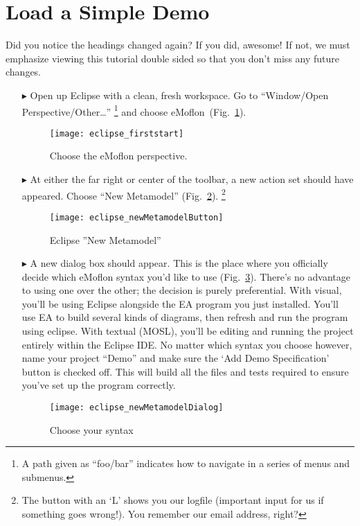 \newpage
\genHeader

\section{Load a Simple Demo}

Did you notice the headings changed again? If you did, awesome! If not, we must emphasize viewing this tutorial double sided so that you don't miss any future changes.

\begin{itemize}
\item[$\blacktriangleright$] Open up Eclipse with a clean, fresh workspace. Go to ``Window/Open Perspective/Other\ldots'' \footnote{A path given as ``foo/bar'' indicates how to navigate in a series of menus and submenus.} and choose eMoflon~(Fig.~\ref{fig_eclipse}).

\begin{figure}[htbp]
	\centering
  \texttt{[image: eclipse\_firststart]}
	\caption{Choose the eMoflon perspective.}
	\label{fig_eclipse}
\end{figure} 

\item[$\blacktriangleright$] At either the far right or center of the toolbar, a new action set should have appeared. Choose ``New Metamodel'' (Fig.~\ref{fig_eclipseNewMetamodelButton}).
\footnote{The button with an `L' shows you our logfile (important input for us if something goes wrong!). You remember our email address, right?}

\begin{figure}[htbp]
	\centering
  \texttt{[image: eclipse\_newMetamodelButton]}
	\caption{Eclipse ''New Metamodel''}
	\label{fig_eclipseNewMetamodelButton}
\end{figure}

\item[$\blacktriangleright$] A new dialog box should appear. This is the place where you officially decide which eMoflon syntax you'd like to use (Fig.~\ref{fig_chooseSyntax}). There's no advantage to using one over the other; the decision is purely preferential. With visual, you'll be using Eclipse alongside the EA program you just installed. You'll use EA to build several kinds of diagrams, then refresh and run the program using eclipse. With textual (MOSL), you'll be editing and running the project entirely within the Eclipse IDE. No matter which syntax you choose however, name your project ``Demo'' and make sure the `Add Demo Specification' button is checked off. This will build all the files and tests required to ensure you've set up the program correctly.  

\vspace{1cm}

\begin{figure}[htbp]
	\centering
  \texttt{[image: eclipse\_newMetamodelDialog]}
	\caption{Choose your syntax}
	\label{fig_chooseSyntax}
\end{figure} 
\end{itemize}



